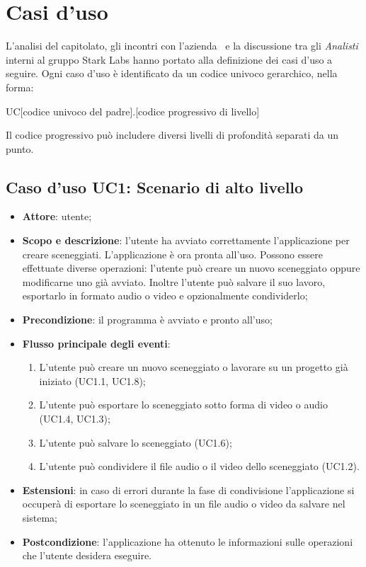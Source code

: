\section{Casi d'uso}
L'analisi del capitolato, gli incontri con l'azienda \AZIENDA\ e la discussione tra gli \textit{Analisti} interni al gruppo Stark Labs hanno portato alla definizione dei casi d'uso a seguire. Ogni caso d'uso è identificato da un codice univoco gerarchico, nella forma:\\
\begin{center}
UC[codice univoco del padre].[codice progressivo di livello]
\end{center}
Il codice progressivo può includere diversi livelli di profondità separati da un punto.

\subsection{Caso d'uso UC1: Scenario di alto livello}
\label{sec:UC1}

\begin{itemize}
\item \textbf{Attore}: utente;
\item \textbf{Scopo e descrizione}: l'utente ha avviato correttamente l'applicazione per creare sceneggiati. L'applicazione è ora pronta all'uso. Possono essere effettuate diverse operazioni: l'utente può creare un nuovo sceneggiato oppure modificarne uno già avviato. Inoltre l'utente può salvare il suo lavoro, esportarlo in formato audio o video e opzionalmente condividerlo;
\item \textbf{Precondizione}: il programma è avviato e pronto all'uso;
\item \textbf{Flusso principale degli eventi}:
\begin{enumerate}
\item L'utente può creare un nuovo sceneggiato o lavorare su un progetto già iniziato (UC1.1, UC1.8);
\item L'utente può esportare lo sceneggiato sotto forma di video o audio (UC1.4, UC1.3);
\item L'utente può salvare lo sceneggiato (UC1.6);
\item L'utente può condividere il file audio o il video dello sceneggiato (UC1.2).
\end{enumerate}
\item \textbf{Estensioni}: in caso di errori durante la fase di condivisione l'applicazione si occuperà di esportare lo sceneggiato in un file audio o video da salvare nel sistema;
\item \textbf{Postcondizione}: l'applicazione ha ottenuto le informazioni sulle operazioni che l'utente desidera eseguire.
\end{itemize}

